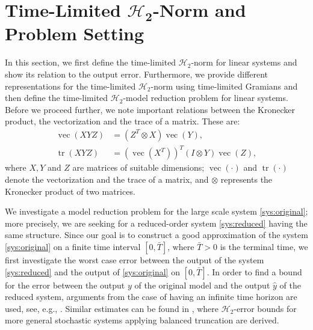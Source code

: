 \documentclass[a4paper,11pt, twoside]{article}
\newcommand{\vect}{\operatorname{vec}}
\newcommand{\trace}{\operatorname{tr}}
\begin{document}
\section{Time-Limited $\boldsymbol{\mathcal H_2}$-Norm and Problem Setting} \label{sec:problemsetting}

In this section, we first define the time-limited $\mathcal H_2$-norm for linear systems and show its relation to the output error. Furthermore, we 
provide different representations for the time-limited $\mathcal H_2$-norm using time-limited Gramians and then define the time-limited 
$\mathcal H_2$-model reduction problem for linear systems. Before we proceed further, we note important relations between the Kronecker 
product, the vectorization and the trace of  a matrix. These are:
\begin{subequations}
\begin{align}\label{vec_kron_rel}
\vect(X Y Z) &= (Z^T\otimes X) \vect(Y) ,\\ \label{vec_trace_rel}
\trace(X Y Z) & = \left(\vect\left(X^T\right)\right)^T (I\otimes Y)\vect(Z),
\end{align}
\end{subequations}
 where $X, Y$ and $Z$ are matrices of suitable dimensions;  $\vect(\cdot)$ and $\trace(\cdot)$ denote the vectorization and the trace of a 
matrix, and $\otimes$ represents the Kronecker product of two matrices.
\smallskip

We investigate a model reduction problem for the large scale system \eqref{sys:original}; more precisely, we are seeking for a reduced-order system 
\eqref{sys:reduced} having the same structure. Since our goal is to construct a good approximation of the system \eqref{sys:original} on a finite 
time interval $[0, \bar T]$, where $\bar T>0$ is the terminal time, we first 
investigate the worst case error between the output of the system \eqref{sys:reduced} 
and the output of \eqref{sys:original} on $[0, \bar  T]$. In order to find a bound for the error between the output $y$ of the original model and the 
output $\hat y$ of the reduced system, arguments from the case of having an infinite time horizon are used, see, e.g., \cite{morAnt05, morGugAB08}. Similar 
estimates can be found in \cite{redmannbenner, redmannfreitag, BTtyp2EB}, where $\mathcal H_2$-error bounds for more general stochastic systems 
applying balanced truncation are derived.\smallskip
\end{document}
